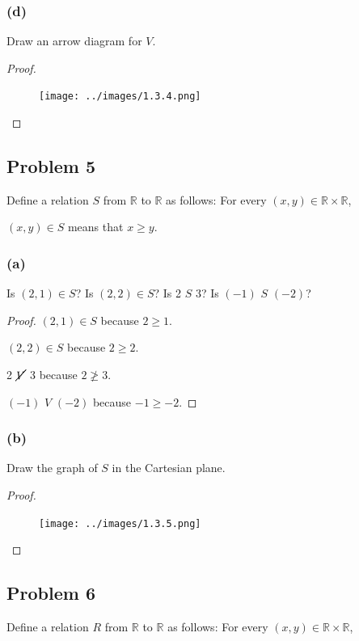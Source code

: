 \documentclass[14pt]{extarticle}
\newcommand{\R}{\mathbb{R}}
\begin{document}
\subsubsection{(d)}
Draw an arrow diagram for $V$.

\begin{proof}
\begin{figure}[ht!]
\centering
\texttt{[image: ../images/1.3.4.png]}
\end{figure}
\end{proof}

\subsection{Problem 5}
Define a relation $S$ from $\R$ to $\R$ as follows:
For every $(x, y) \in \R \times \R$,

\begin{center}
$(x, y) \in S$ means that $x \geq y$.
\end{center}

\subsubsection{(a)}
Is $(2, 1) \in S$? Is $(2, 2) \in S$? Is 2 $S$ 3? Is $(-1)$ $S$ $(-2)$?

\begin{proof}
$(2, 1) \in S$ because $2 \geq 1$.

$(2, 2) \in S$ because $2 \geq 2$.

2 $\cancel{V}$ 3 because $2 \ngeq 3$.

$(-1)$ $V$ $(-2)$ because $-1 \geq -2$.
\end{proof}

\subsubsection{(b)}
Draw the graph of $S$ in the Cartesian plane.

\begin{proof}
\begin{figure}[ht!]
\centering
\texttt{[image: ../images/1.3.5.png]}
\end{figure}
\end{proof}

\subsection{Problem 6}
Define a relation $R$ from $\R$ to $\R$ as follows:
For every $(x, y) \in \R \times \R$,
\end{document}
